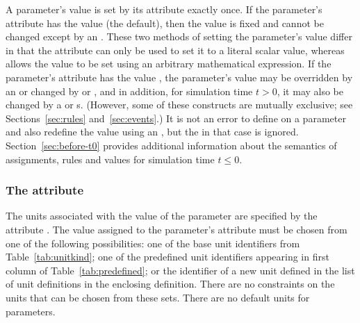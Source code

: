 A parameter's value is set by its  attribute exactly
once.  If the parameter's  attribute has the value
 (the default), then the value is fixed and cannot be
changed except by an \InitialAssignment.  These two methods of
setting the parameter's value differ in that the 
attribute can only be used to set it to a literal scalar value,
whereas \InitialAssignment allows the value to be set using an
arbitrary mathematical expression.  If the parameter's
 attribute has the value , the parameter's
value may be overridden by an \InitialAssignment or changed by
\AssignmentRule or \AlgebraicRule, and in addition, for simulation
time $t > 0$, it may also be changed by a \RateRule or \Event{}s.
(However, some of these constructs are mutually exclusive; see
Sections~\ref{sec:rules} and~\ref{sec:events}.)  It is not an
error to define  on a parameter and also redefine the
value using an \InitialAssignment, but the  in that
case is ignored.  Section~\ref{sec:before-t0} provides additional
information about the semantics of assignments, rules and values
for simulation time $t \leq 0$.


\subsubsection{The  attribute}
\label{sec:parameter-units}

The units associated with the value of the parameter are specified
by the attribute .  The value assigned to
the parameter's  attribute must be chosen
from one of the following possibilities: one of the base unit
identifiers from Table~\vref{tab:unitkind}; one of the predefined
unit identifiers appearing in first column of
Table~\vref{tab:predefined}; or the identifier of a new unit defined
in the list of unit definitions in the enclosing \Model definition.
There are no constraints on the units that can be chosen from
these sets.  There are no default units for parameters.

